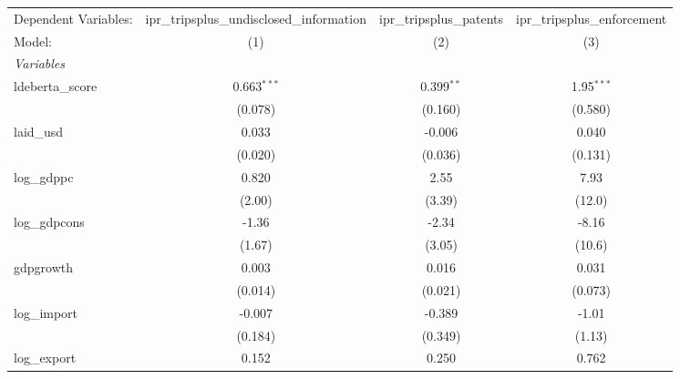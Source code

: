 
\begingroup
\centering
\begin{tabular}{lccc}
   \tabularnewline \midrule \midrule
   Dependent Variables:                  & ipr\_tripsplus\_undisclosed\_information    & ipr\_tripsplus\_patents   & ipr\_tripsplus\_enforcement\\    
   Model:                                & (1)                                         & (2)                       & (3)\\  
   \midrule
   \emph{Variables}\\
   ldeberta\_score                       & 0.663$^{***}$                               & 0.399$^{**}$              & 1.95$^{***}$\\   
                                         & (0.078)                                     & (0.160)                   & (0.580)\\   
   laid\_usd                             & 0.033                                       & -0.006                    & 0.040\\   
                                         & (0.020)                                     & (0.036)                   & (0.131)\\   
   log\_gdppc                            & 0.820                                       & 2.55                      & 7.93\\   
                                         & (2.00)                                      & (3.39)                    & (12.0)\\   
   log\_gdpcons                          & -1.36                                       & -2.34                     & -8.16\\   
                                         & (1.67)                                      & (3.05)                    & (10.6)\\   
   gdpgrowth                             & 0.003                                       & 0.016                     & 0.031\\   
                                         & (0.014)                                     & (0.021)                   & (0.073)\\   
   log\_import                           & -0.007                                      & -0.389                    & -1.01\\   
                                         & (0.184)                                     & (0.349)                   & (1.13)\\   
   log\_export                           & 0.152                                       & 0.250                     & 0.762\\   

\end{tabular}
